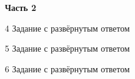 \documentclass[vpr]{libre-oge}
\begin{document}
\newpage

\begin{center}
	\textbf{Часть 2}
	\smallskip
\end{center}

\begin{task}{4}
Задание с развёрнутым ответом
\vpradvancedanswerfield
\end{task}

\begin{task}{5}
Задание с развёрнутым ответом
\vpradvancedanswerfield
\end{task}

\begin{task}{6}
Задание с развёрнутым ответом
\vpradvancedanswerfield
\end{task}
\end{document}
